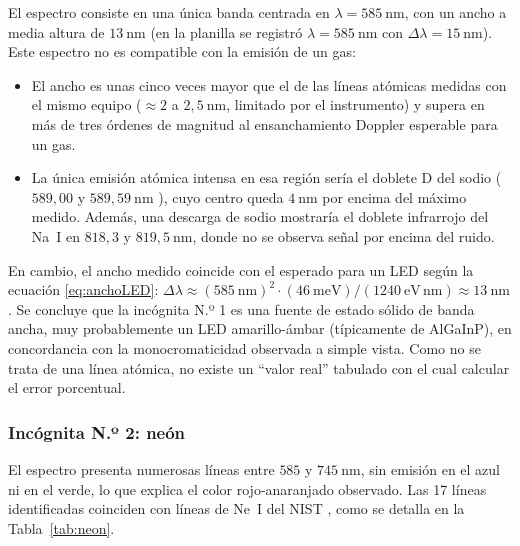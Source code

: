 \documentclass{article}
\newcommand{\nm}{\ \mathrm{nm}}
\begin{document}
El espectro consiste en una única banda centrada en $\lambda=585\nm$, con un ancho a media altura de $13\nm$ (en la planilla se registró $\lambda=585\nm$ con $\Delta\lambda=15\nm$). Este espectro no es compatible con la emisión de un gas:
\begin{itemize}
    \item El ancho es unas cinco veces mayor que el de las líneas atómicas medidas con el mismo equipo ($\approx2$ a $2,5\nm$, limitado por el instrumento) y supera en más de tres órdenes de magnitud al ensanchamiento Doppler esperable para un gas.
    \item La única emisión atómica intensa en esa región sería el doblete D del sodio ($589,00$ y $589,59\nm$ \cite{nist-na}), cuyo centro queda $4\nm$ por encima del máximo medido. Además, una descarga de sodio mostraría el doblete infrarrojo del Na~I en $818,3$ y $819,5\nm$, donde no se observa señal por encima del ruido.
\end{itemize}
En cambio, el ancho medido coincide con el esperado para un LED según la ecuación \eqref{eq:anchoLED}: $\Delta\lambda\approx(585\nm)^2\cdot(46\ \mathrm{meV})/(1240\ \mathrm{eV\,nm})\approx13\nm$. Se concluye que la incógnita N.º 1 es una fuente de estado sólido de banda ancha, muy probablemente un LED amarillo-ámbar (típicamente de AlGaInP), en concordancia con la monocromaticidad observada a simple vista. Como no se trata de una línea atómica, no existe un ``valor real'' tabulado con el cual calcular el error porcentual.

\subsubsection{Incógnita N.º 2: neón}

El espectro presenta numerosas líneas entre $585$ y $745\nm$, sin emisión en el azul ni en el verde, lo que explica el color rojo-anaranjado observado. Las 17 líneas identificadas coinciden con líneas de Ne~I del NIST \cite{nist-ne}, como se detalla en la Tabla~\ref{tab:neon}.
\end{document}
